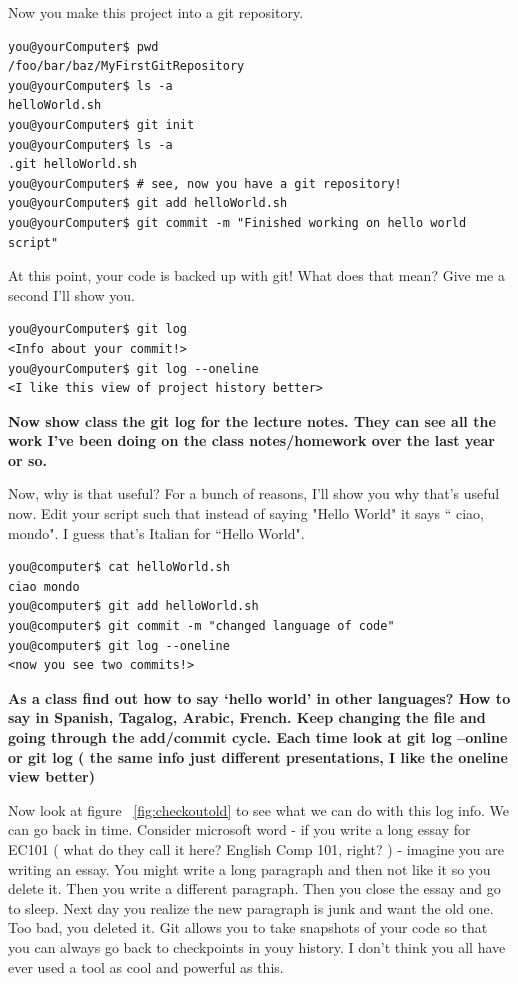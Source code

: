 \documentclass[10pt]{article}
\begin{document}
Now you make this project into a git repository. 

\begin{lstlisting}[style=term]
you@yourComputer$ pwd
/foo/bar/baz/MyFirstGitRepository
you@yourComputer$ ls -a
helloWorld.sh
you@yourComputer$ git init
you@yourComputer$ ls -a
.git helloWorld.sh
you@yourComputer$ # see, now you have a git repository!
you@yourComputer$ git add helloWorld.sh
you@yourComputer$ git commit -m "Finished working on hello world script"
\end{lstlisting}

At this point, your code is backed up with git! What does that mean? Give me a
second I'll show you.

\begin{lstlisting}[style=term]
you@yourComputer$ git log
<Info about your commit!>
you@yourComputer$ git log --oneline
<I like this view of project history better>
\end{lstlisting}

\textbf{Now show class the git log for the lecture notes. They can see all the
work I've been doing on the class notes/homework over the last year or so.}

Now, why is that useful? For a bunch of reasons, I'll show you why that's useful
now. Edit your script such that instead of saying "Hello World" it says `` ciao,
mondo". I guess that's Italian for ``Hello World".

\begin{lstlisting}[style=term]
you@computer$ cat helloWorld.sh
ciao mondo
you@computer$ git add helloWorld.sh
you@computer$ git commit -m "changed language of code"
you@computer$ git log --oneline
<now you see two commits!>
\end{lstlisting}

\textbf{As a class find out how to say `hello world' in other languages? How to
say in Spanish, Tagalog, Arabic, French. Keep changing the file and going
through the add/commit cycle. Each time look at git log --online or git log (
the same info just different presentations, I like the oneline view better)}

Now look at figure ~\ref{fig:checkoutold} to see what we can do with this log
info. We can go back in time. Consider microsoft word - if you write a long
essay for EC101 ( what do they call it here? English Comp 101, right? ) -
imagine you are writing an essay. You might write a long paragraph and then not
like it so you delete it. Then you write a different paragraph. Then you close
the essay and go to sleep. Next day you realize the new paragraph is junk and
want the old one. Too bad, you deleted it. Git allows you to take snapshots of
your code so that you can always go back to checkpoints in youy history. I don't
think you all have ever used a tool as cool and powerful as this.
\end{document}
